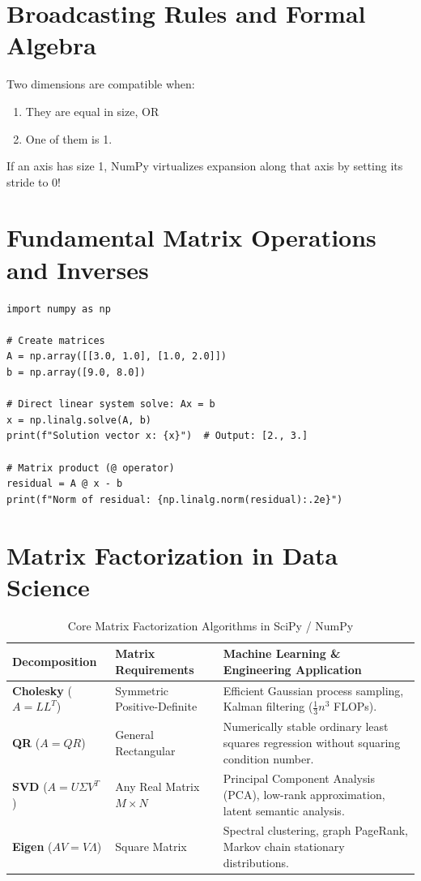 \section{Broadcasting Rules and Formal Algebra}
\begin{theorem}
Two dimensions are compatible when:
\begin{enumerate}
    \item They are equal in size, OR
    \item One of them is 1.
\end{enumerate}
If an axis has size 1, NumPy virtualizes expansion along that axis by setting its stride to 0!
\end{theorem}

\section{Fundamental Matrix Operations and Inverses}
\begin{lstlisting}
import numpy as np

# Create matrices
A = np.array([[3.0, 1.0], [1.0, 2.0]])
b = np.array([9.0, 8.0])

# Direct linear system solve: Ax = b
x = np.linalg.solve(A, b)
print(f"Solution vector x: {x}")  # Output: [2., 3.]

# Matrix product (@ operator)
residual = A @ x - b
print(f"Norm of residual: {np.linalg.norm(residual):.2e}")
\end{lstlisting}

\section{Matrix Factorization in Data Science}
\begin{table}[htbp]
\centering
\small
\begin{tabularx}{\linewidth}{lp{3.5cm}X}
\toprule
\textbf{Decomposition} & \textbf{Matrix Requirements} & \textbf{Machine Learning \& Engineering Application} \\
\midrule
\textbf{Cholesky} ($A = L L^T$) & Symmetric Positive-Definite & Efficient Gaussian process sampling, Kalman filtering ($\frac{1}{3} n^3$ FLOPs). \\
\textbf{QR} ($A = Q R$) & General Rectangular & Numerically stable ordinary least squares regression without squaring condition number. \\
\textbf{SVD} ($A = U \Sigma V^T$) & Any Real Matrix $M \times N$ & Principal Component Analysis (PCA), low-rank approximation, latent semantic analysis. \\
\textbf{Eigen} ($A V = V \Lambda$) & Square Matrix & Spectral clustering, graph PageRank, Markov chain stationary distributions. \\
\bottomrule
\end{tabularx}
\caption{Core Matrix Factorization Algorithms in SciPy / NumPy}
\end{table}

